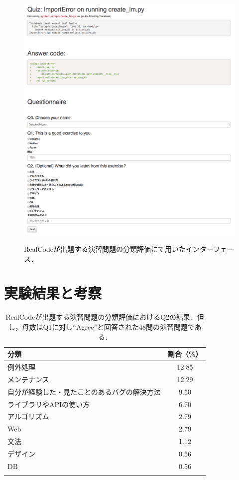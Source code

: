 \begin{figure}[H]
　\centering
  \includegraphics[width=1.0\columnwidth]{20181218-lab-study-interface-all.png}
  \caption{RealCodeが出題する演習問題の分類評価にて用いたインターフェース．}
  \label{fig:lab-study}
\end{figure}

\section{実験結果と考察}

\begin{table}[b]
  \centering
  \caption{RealCodeが出題する演習問題の分類評価におけるQ2の結果．但し，母数はQ1に対し``Agree''と回答された48問の演習問題である．}
  \label{table:lab-study-q2-result}
  \begin{tabular}{ l | c } \Xhline{3\arrayrulewidth}
      分類 & 割合（\%） \\ \hline \hline
      例外処理 & 12.85 \\
      メンテナンス & 12.29  \\
      自分が経験した・見たことのあるバグの解決方法 & 9.50 \\
      ライブラリやAPIの使い方 & 6.70 \\
      アルゴリズム & 2.79 \\
      Web & 2.79 \\
      文法 & 1.12 \\  
      デザイン & 0.56 \\
      DB & 0.56 \\
      \Xhline{3\arrayrulewidth}
  \end{tabular}
\end{table}

